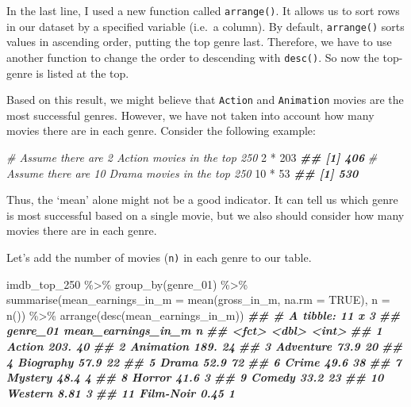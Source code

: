 \documentclass[
]{book}
\newenvironment{Shaded}{\begin{snugshade}}{\end{snugshade}}
\newcommand{\AttributeTok}[1]{\textcolor[rgb]{0.77,0.63,0.00}{#1}}
\newcommand{\CommentTok}[1]{\textcolor[rgb]{0.56,0.35,0.01}{\textit{#1}}}
\newcommand{\ConstantTok}[1]{\textcolor[rgb]{0.00,0.00,0.00}{#1}}
\newcommand{\DecValTok}[1]{\textcolor[rgb]{0.00,0.00,0.81}{#1}}
\newcommand{\DocumentationTok}[1]{\textcolor[rgb]{0.56,0.35,0.01}{\textbf{\textit{#1}}}}
\newcommand{\FunctionTok}[1]{\textcolor[rgb]{0.00,0.00,0.00}{#1}}
\newcommand{\NormalTok}[1]{#1}
\newcommand{\SpecialCharTok}[1]{\textcolor[rgb]{0.00,0.00,0.00}{#1}}
\begin{document}
In the last line, I used a new function called \texttt{arrange()}. It allows us to sort rows in our dataset by a specified variable (i.e.~a column). By default, \texttt{arrange()} sorts values in ascending order, putting the top genre last. Therefore, we have to use another function to change the order to descending with \texttt{desc()}. So now the top-genre is listed at the top.

Based on this result, we might believe that \texttt{Action} and \texttt{Animation} movies are the most successful genres. However, we have not taken into account how many movies there are in each genre. Consider the following example:

\begin{Shaded}
\begin{Highlighting}[]
\CommentTok{\# Assume there are 2 Action movies in the top 250}
\DecValTok{2} \SpecialCharTok{*} \DecValTok{203}
\DocumentationTok{\#\# [1] 406}
\CommentTok{\# Assume there are 10 Drama movies in the top 250}
\DecValTok{10} \SpecialCharTok{*} \DecValTok{53}
\DocumentationTok{\#\# [1] 530}
\end{Highlighting}
\end{Shaded}

Thus, the `mean' alone might not be a good indicator. It can tell us which genre is most successful based on a single movie, but we also should consider how many movies there are in each genre.

Let's add the number of movies (\texttt{n)} in each genre to our table.

\begin{Shaded}
\begin{Highlighting}[]
\NormalTok{imdb\_top\_250 }\SpecialCharTok{\%\textgreater{}\%} 
  \FunctionTok{group\_by}\NormalTok{(genre\_01) }\SpecialCharTok{\%\textgreater{}\%}
  \FunctionTok{summarise}\NormalTok{(}\AttributeTok{mean\_earnings\_in\_m =} \FunctionTok{mean}\NormalTok{(gross\_in\_m, }\AttributeTok{na.rm =} \ConstantTok{TRUE}\NormalTok{),}
            \AttributeTok{n =} \FunctionTok{n}\NormalTok{()) }\SpecialCharTok{\%\textgreater{}\%} 
  \FunctionTok{arrange}\NormalTok{(}\FunctionTok{desc}\NormalTok{(mean\_earnings\_in\_m))}
\DocumentationTok{\#\# \# A tibble: 11 x 3}
\DocumentationTok{\#\#    genre\_01  mean\_earnings\_in\_m     n}
\DocumentationTok{\#\#    \textless{}fct\textgreater{}                  \textless{}dbl\textgreater{} \textless{}int\textgreater{}}
\DocumentationTok{\#\#  1 Action                203.      40}
\DocumentationTok{\#\#  2 Animation             189.      24}
\DocumentationTok{\#\#  3 Adventure              73.9     20}
\DocumentationTok{\#\#  4 Biography              57.9     22}
\DocumentationTok{\#\#  5 Drama                  52.9     72}
\DocumentationTok{\#\#  6 Crime                  49.6     38}
\DocumentationTok{\#\#  7 Mystery                48.4      4}
\DocumentationTok{\#\#  8 Horror                 41.6      3}
\DocumentationTok{\#\#  9 Comedy                 33.2     23}
\DocumentationTok{\#\# 10 Western                 8.81     3}
\DocumentationTok{\#\# 11 Film{-}Noir               0.45     1}
\end{Highlighting}
\end{Shaded}
\end{document}
